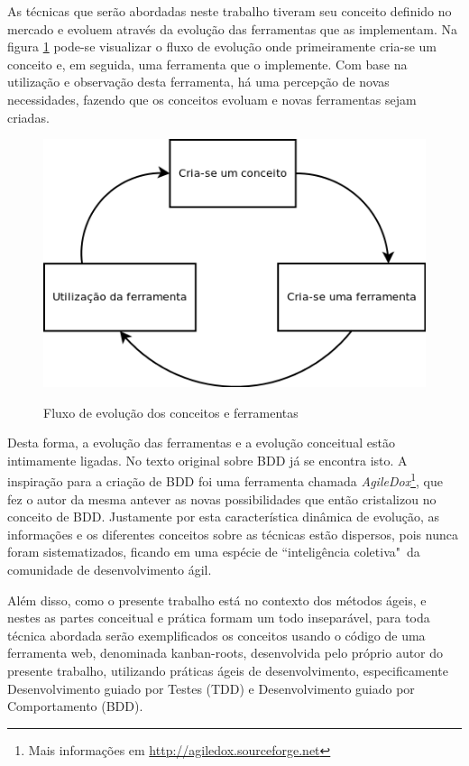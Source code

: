 As técnicas que serão abordadas neste trabalho tiveram seu conceito definido no mercado e evoluem através da evolução das ferramentas que as implementam. Na figura \ref{img:fluxo_conceito_ferramenta} pode-se visualizar o fluxo de evolução onde primeiramente cria-se um conceito e, em seguida, uma ferramenta que o implemente. Com base na utilização e observação desta ferramenta, há uma percepção de novas necessidades, fazendo que os conceitos evoluam e novas ferramentas sejam criadas.

\begin{figure}[h]
  \center
  \caption{Fluxo de evolução dos conceitos e ferramentas}
  \includegraphics[scale=0.60]{images/fluxo-conceito-ferramenta}
  \label{img:fluxo_conceito_ferramenta}
\end{figure}

Desta forma, a evolução das ferramentas e a evolução conceitual estão intimamente ligadas. No texto original sobre BDD \cite{IntroducingBDD} já se encontra isto. A inspiração para a criação de BDD foi uma ferramenta chamada \textit{AgileDox}\footnote{Mais informações em \url{http://agiledox.sourceforge.net}}, que fez o autor da mesma antever as novas possibilidades que então cristalizou no conceito de BDD. Justamente por esta característica dinâmica de evolução, as informações e os diferentes conceitos sobre as técnicas estão dispersos, pois nunca foram sistematizados, ficando em uma espécie de ``inteligência coletiva"\ da comunidade de desenvolvimento ágil.

Além disso, como o presente trabalho está no contexto dos métodos ágeis, e nestes as partes conceitual e prática formam um todo inseparável, para toda técnica abordada serão exemplificados os conceitos usando o código de uma ferramenta web, denominada kanban-roots, desenvolvida pelo próprio autor do presente trabalho, utilizando práticas ágeis de desenvolvimento, especificamente Desenvolvimento guiado por Testes (TDD) e Desenvolvimento guiado por Comportamento (BDD).


